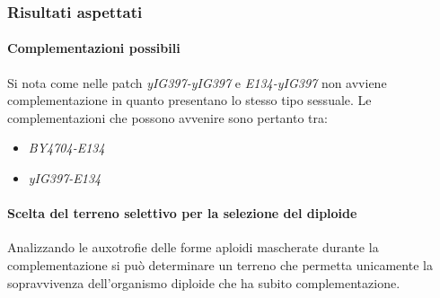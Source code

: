 		\subsubsection*{Risultati aspettati}

			\paragraph*{Complementazioni possibili}
			Si nota come nelle patch \emph{yIG397-yIG397} e \emph{E134-yIG397} non avviene complementazione in quanto presentano lo stesso tipo sessuale.
			Le complementazioni che possono avvenire sono pertanto tra:
			\begin{multicols}{2}
				\begin{itemize}
					\item \emph{BY4704-E134}
					\item \emph{yIG397-E134}
				\end{itemize}
			\end{multicols}

			\paragraph*{Scelta del terreno selettivo per la selezione del diploide}
			Analizzando le auxotrofie delle forme aploidi mascherate durante la complementazione si pu\`o determinare un terreno che permetta unicamente la sopravvivenza dell'organismo diploide che ha subito complementazione.
				

